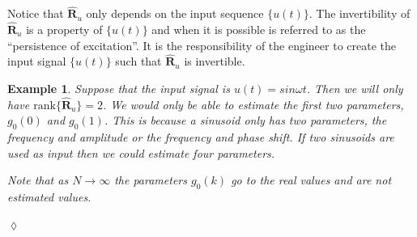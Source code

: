 \documentclass[lecture,12pt,]{pcms-l}
\theoremstyle{example}
\newtheorem{example}{Example}[section]
\newcommand{\w}{\omega}
\begin{document}
Notice that $\hat{\mathbf{R}}_u$ only depends on the input sequence $\{u(t)\}$. The invertibility of $\hat{\mathbf{R}}_u$ is a property of $\{u(t)\}$ and when it is possible is referred to as the ``persistence of excitation''. It is the responsibility of the engineer to create the input signal $\{u(t)\}$ such that $\hat{\mathbf{R}}_u$ is invertible.

\begin{example}
Suppose that the input signal is $u(t)=sin\w t$. Then we will only have $\text{rank}\{\hat{\mathbf{R}}_u\}=2$. We would only be able to estimate the first two parameters, $g_0(0)$ and $g_0(1)$. This is because a sinusoid only has two parameters, the frequency and amplitude or the frequency and phase shift. If two sinusoids are used as input then we could estimate four parameters.

Note that as $N\to\infty$ the parameters $g_0(k)$ go to the real values and are not estimated values.
\end{example}
$\lozenge$
\end{document}
